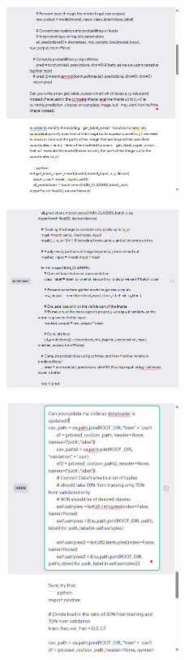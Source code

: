 \documentclass{article}
\begin{document}
\begin{figure}[H]
    \centering
    \includegraphics[width=0.5\textwidth]{report_data/g-15.png}
\end{figure}

\begin{figure}[H]
    \centering
    \includegraphics[width=0.5\textwidth]{report_data/g-16.png}
\end{figure}

\begin{figure}[H]
    \centering
    \includegraphics[width=0.5\textwidth]{report_data/g-17.png}
\end{figure}
\end{document}
